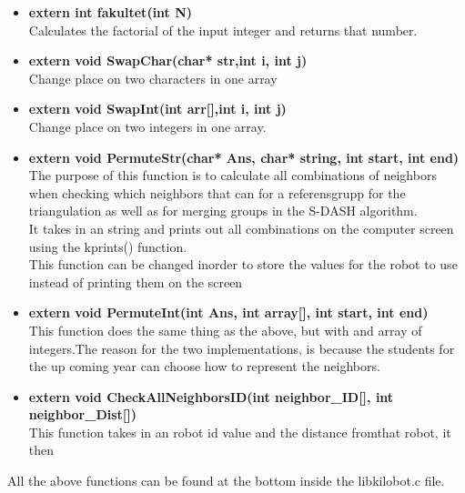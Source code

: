 \begin{itemize}
\item \textbf{extern int fakultet(int N)}\\
Calculates the factorial of the input integer and returns that number.

\item \textbf{extern void SwapChar(char* str,int i, int j)}\\
Change place on two characters in one array

\item \textbf{extern void SwapInt(int arr[],int i, int j)}\\
Change place on two integers in one array.

\item \textbf{extern void PermuteStr(char* Ans, char* string, int start, int end)}\\
The purpose of this function is to calculate all combinations of neighbors when checking which neighbors that can for a referensgrupp for the triangulation as well as for merging groups in the S-DASH algorithm.\\
It takes in an string and prints out all combinations on the computer screen using the kprints() function.\\
This function can be changed inorder to store the values for the robot to use instead of printing them on the screen

\item \textbf{extern void PermuteInt(int Ans, int array[], int start, int end)}\\
This function does the same thing as the above, but with and array of integers.The reason for the two implementations, is because the students for the up coming year can choose how to represent the neighbors.

\item \textbf{extern void CheckAllNeighborsID(int neighbor\_ID[], int neighbor\_Dist[])}\\
This function takes in an robot id value and the distance fromthat robot, it then
\end{itemize}
All the above functions can be found at the bottom inside the libkilobot.c file.



